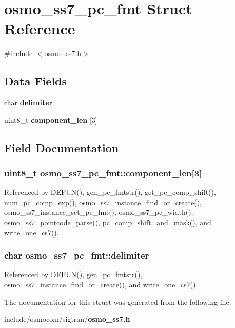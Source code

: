 \section{osmo\+\_\+ss7\+\_\+pc\+\_\+fmt Struct Reference}
\label{structosmo__ss7__pc__fmt}


{\ttfamily \#include $<$osmo\+\_\+ss7.\+h$>$}

\subsection*{Data Fields}
\begin{DoxyCompactItemize}
\item 
char {\bf delimiter}
\item 
uint8\+\_\+t {\bf component\+\_\+len} [3]
\end{DoxyCompactItemize}


\subsection{Field Documentation}
\subsubsection[{component\+\_\+len}]{\setlength{\rightskip}{0pt plus 5cm}uint8\+\_\+t osmo\+\_\+ss7\+\_\+pc\+\_\+fmt\+::component\+\_\+len[3]}\label{structosmo__ss7__pc__fmt_ae7d9be7df3815a6eb1d4de66c99881f6}


Referenced by D\+E\+F\+U\+N(), gen\+\_\+pc\+\_\+fmtstr(), get\+\_\+pc\+\_\+comp\+\_\+shift(), num\+\_\+pc\+\_\+comp\+\_\+exp(), osmo\+\_\+ss7\+\_\+instance\+\_\+find\+\_\+or\+\_\+create(), osmo\+\_\+ss7\+\_\+instance\+\_\+set\+\_\+pc\+\_\+fmt(), osmo\+\_\+ss7\+\_\+pc\+\_\+width(), osmo\+\_\+ss7\+\_\+pointcode\+\_\+parse(), pc\+\_\+comp\+\_\+shift\+\_\+and\+\_\+mask(), and write\+\_\+one\+\_\+cs7().

\subsubsection[{delimiter}]{\setlength{\rightskip}{0pt plus 5cm}char osmo\+\_\+ss7\+\_\+pc\+\_\+fmt\+::delimiter}\label{structosmo__ss7__pc__fmt_a68e54cafb7f42c64ec79dcbe8d6a0ae0}


Referenced by D\+E\+F\+U\+N(), gen\+\_\+pc\+\_\+fmtstr(), osmo\+\_\+ss7\+\_\+instance\+\_\+find\+\_\+or\+\_\+create(), and write\+\_\+one\+\_\+cs7().



The documentation for this struct was generated from the following file\+:\begin{DoxyCompactItemize}
\item 
include/osmocom/sigtran/{\bf osmo\+\_\+ss7.\+h}\end{DoxyCompactItemize}
